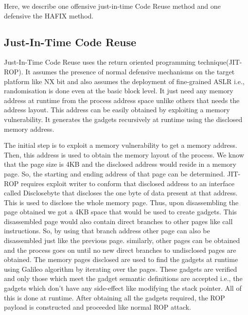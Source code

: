 \documentclass{article}
\begin{document}
\begin{multicols}{2}
	Here, we describe one offensive just-in-time Code Reuse \cite{jitrop} method and one defensive the HAFIX \cite{hafix} method.
	
	\subsection{Just-In-Time Code Reuse}
	Just-In-Time Code Reuse uses the return oriented programming technique(JIT-ROP). It assumes the presence of normal defensive mechanisms on the target platform like NX bit and also assumes the deployment of fine-grained ASLR i.e., randomisation is done even at the basic block level. It just need any memory address at runtime from the process address space unlike others that needs the address layout. This address can be easily obtained by exploiting a memory vulnerability. It generates the gadgets recursively at runtime using the disclosed memory address.
	
	The initial step is to exploit a memory vulnerability to get a memory address. Then, this address is used to obtain the memory layout of the process. We know that the page size is 4KB and the disclosed address would reside in a memory page. So, the starting and ending address of that page can be determined. JIT-ROP requires exploit writer to conform that disclosed address to an interface called Disclosebyte that discloses the one byte of data present at that address. This is used to disclose the whole memory page. Thus, upon disassembling the page obtained we got a 4KB space that would be used to create gadgets. This disassembled page would also contain direct branches to other pages like call instructions. So, by using that branch address other page can also be disassembled just like the previous page. similarly, other pages can be obtained and the process goes on until no new direct branches to undisclosed pages are obtained. The memory pages disclosed are used to find the gadgets at runtime using Galileo algorithm by iterating over the pages. These gadgets are verified and only those which meet the gadget semantic definitions are accepted i.e., the gadgets which don't have any side-effect like modifying the stack pointer. All of this is done at runtime. After obtaining all the gadgets required, the ROP payload is constructed and proceeded like normal ROP attack.
	

\end{multicols}
\end{document}
